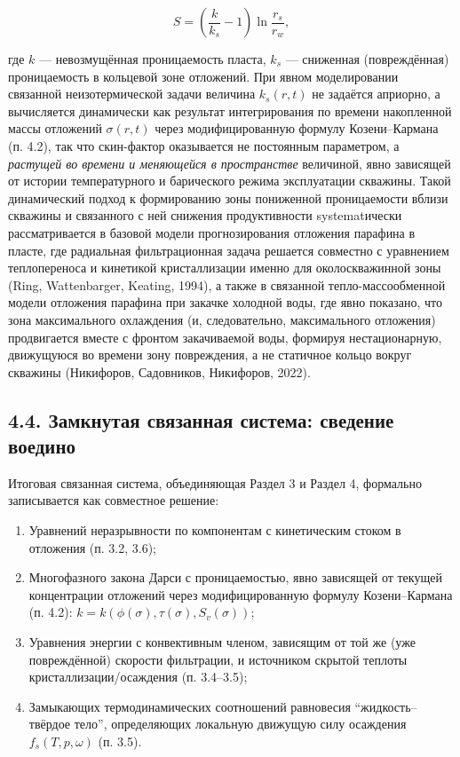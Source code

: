 \documentclass[11pt]{extarticle}
\providecommand{\tightlist}{\setlength{\itemsep}{0pt}\setlength{\parskip}{0pt}}
\begin{document}
\[
S = \left(\frac{k}{k_s}-1\right)\ln\frac{r_s}{r_w},
\]

где \(k\) --- невозмущённая проницаемость пласта, \(k_s\) --- сниженная (повреждённая) проницаемость в кольцевой зоне отложений. При явном моделировании связанной неизотермической задачи величина \(k_s(r,t)\) не задаётся априорно, а вычисляется динамически как результат интегрирования по времени накопленной массы отложений \(\sigma(r,t)\) через модифицированную формулу Козени--Кармана (п. 4.2), так что скин-фактор оказывается не постоянным параметром, а \emph{растущей во времени и меняющейся в пространстве} величиной, явно зависящей от истории температурного и барического режима эксплуатации скважины. Такой динамический подход к формированию зоны пониженной проницаемости вблизи скважины и связанного с ней снижения продуктивности systematически рассматривается в базовой модели прогнозирования отложения парафина в пласте, где радиальная фильтрационная задача решается совместно с уравнением теплопереноса и кинетикой кристаллизации именно для околоскважинной зоны (Ring, Wattenbarger, Keating, 1994), а также в связанной тепло-массообменной модели отложения парафина при закачке холодной воды, где явно показано, что зона максимального охлаждения (и, следовательно, максимального отложения) продвигается вместе с фронтом закачиваемой воды, формируя нестационарную, движущуюся во времени зону повреждения, а не статичное кольцо вокруг скважины (Никифоров, Садовников, Никифоров, 2022).

\subsection{4.4. Замкнутая связанная система: сведение воедино}\label{ux437ux430ux43cux43aux43dux443ux442ux430ux44f-ux441ux432ux44fux437ux430ux43dux43dux430ux44f-ux441ux438ux441ux442ux435ux43cux430-ux441ux432ux435ux434ux435ux43dux438ux435-ux432ux43eux435ux434ux438ux43dux43e}

Итоговая связанная система, объединяющая Раздел 3 и Раздел 4, формально записывается как совместное решение:

\begin{enumerate}
\def\labelenumi{\arabic{enumi}.}
\tightlist
\item
  Уравнений неразрывности по компонентам с кинетическим стоком в отложения (п. 3.2, 3.6);
\item
  Многофазного закона Дарси с проницаемостью, явно зависящей от текущей концентрации отложений через модифицированную формулу Козени--Кармана (п. 4.2): \(k=k(\phi(\sigma), \tau(\sigma), S_v(\sigma))\);
\item
  Уравнения энергии с конвективным членом, зависящим от той же (уже повреждённой) скорости фильтрации, и источником скрытой теплоты кристаллизации/осаждения (п. 3.4--3.5);
\item
  Замыкающих термодинамических соотношений равновесия ``жидкость--твёрдое тело'', определяющих локальную движущую силу осаждения \(f_s(T,p,\omega)\) (п. 3.5).
\end{enumerate}
\end{document}
